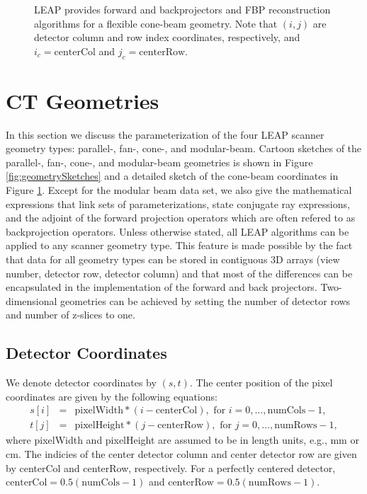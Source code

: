 \documentclass[11pt]{article}
\begin{document}
\begin{figure}[h]

\caption{LEAP provides forward and backprojectors and FBP reconstruction algorithms for a flexible cone-beam geometry.  Note that $(i,j)$ are detector column and row index coordinates, respectively, and $i_c = \text{centerCol}$ and $j_c = \text{centerRow}$.} \label{fig:coneBeamSketch}
\end{figure}

\section{CT Geometries} \label{sec:CTGeometries}

In this section we discuss the parameterization of the four LEAP scanner geometry types: parallel-, fan-, cone-, and modular-beam.  Cartoon sketches of the parallel-, fan-, cone-, and modular-beam geometries is shown in Figure \ref{fig:geometrySketches} and a detailed sketch of the cone-beam coordinates in Figure \ref{fig:coneBeamSketch}.  Except for the modular beam data set, we also give the mathematical expressions that link sets of parameterizations, state conjugate ray expressions, and the adjoint of the forward projection operators which are often refered to as backprojection operators.  Unless otherwise stated, all LEAP algorithms can be applied to any scanner geometry type.  This feature is made possible by the fact that data for all geometry types can be stored in contiguous 3D arrays (view number, detector row, detector column) and that most of the differences can be encapsulated in the implementation of the forward and back projectors.  Two-dimensional geometries can be achieved by setting the number of detector rows and number of z-slices to one.

\subsection{Detector Coordinates} \label{sec:DetectorCoordinates}

We denote detector coordinates by $(s,t)$.  The center position of the pixel coordinates are given by the following equations:
\begin{eqnarray*}
s[i] &=& \text{pixelWidth}*(i - \text{centerCol}), \text{ for } i = 0, \dots, \text{numCols}-1, \\
t[j] &=& \text{pixelHeight}*(j - \text{centerRow}), \text{ for } j = 0, \dots, \text{numRows}-1,
\end{eqnarray*}
where pixelWidth and pixelHeight are assumed to be in length units, e.g., mm or cm.  The indicies of the center detector column and center detector row are given by centerCol and centerRow, respectively.  For a perfectly centered detector, $\text{centerCol} = 0.5(\text{numCols}-1)$ and $\text{centerRow} = 0.5(\text{numRows}-1)$.
\end{document}
